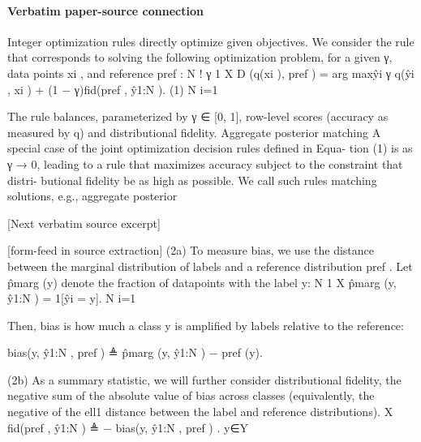 \documentclass[10pt]{article}
\begin{document}
\paragraph{Verbatim paper-source connection}
\begin{ReviewVerbatim}
Integer optimization rules directly optimize given objectives. We consider the rule that corresponds to
     solving the following optimization problem, for a given γ, data points {xi }, and reference pref :
                                                            N
                                                                           !
                      γ                                  1 X
                   D ({q(xi )}, pref ) = arg max{ŷi } γ       q(ŷi , xi ) + (1 − γ)fid(pref , ŷ1:N ). (1)
                                                         N i=1

     The rule balances, parameterized by γ ∈ [0, 1], row-level scores (accuracy as measured by q) and
     distributional fidelity.
Aggregate posterior matching A special case of the joint optimization decision rules defined in Equa-
    tion (1) is as γ → 0, leading to a rule that maximizes accuracy subject to the constraint that distri-
    butional fidelity be as high as possible. We call such rules matching solutions, e.g., aggregate posterior

[Next verbatim source excerpt]


[form-feed in source extraction]
    (2a) To measure bias, we use the distance between the marginal distribution of labels and a reference
distribution pref . Let p̂marg (y) denote the fraction of datapoints with the label y:
                                                                     N
                                                                 1 X
                                          p̂marg (y, ŷ1:N ) =         1[ŷi = y].
                                                                 N i=1

Then, bias is how much a class y is amplified by labels relative to the reference:

                                    bias(y, ŷ1:N , pref ) ≜ p̂marg (y, ŷ1:N ) − pref (y).

    (2b) As a summary statistic, we will further consider distributional fidelity, the negative sum of the
absolute value of bias across classes (equivalently, the negative of the ell1 distance between the label and
reference distributions).
                                                        X
                                 fid(pref , ŷ1:N ) ≜ −   bias(y, ŷ1:N , pref ) .
                                                            y∈Y
\end{ReviewVerbatim}
\end{document}
